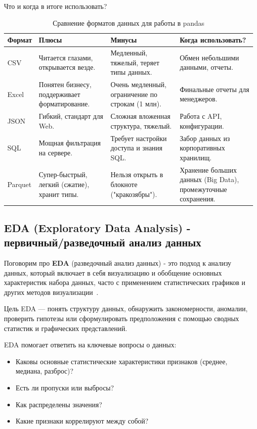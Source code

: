 \documentclass[pract]{SCWorks}
\begin{document}
Что и когда в итоге использовать?

\begin{table}[H]
\centering
\caption{Сравнение форматов данных для работы в pandas}
\begin{tabular}{|p{2cm}|p{4.2cm}|p{4.2cm}|p{4.8cm}|}
\hline
\textbf{Формат} & \textbf{Плюсы} & \textbf{Минусы} & \textbf{Когда использовать?} \\ \hline
CSV & Читается глазами, открывается везде. & Медленный, тяжелый, теряет типы данных. & Обмен небольшими данными, отчеты. \\ \hline
Excel & Понятен бизнесу, поддерживает форматирование. & Очень медленный, ограничение по строкам (1 млн). & Финальные отчеты для менеджеров. \\ \hline
JSON & Гибкий, стандарт для Web. & Сложная вложенная структура, тяжелый. & Работа с API, конфигурации. \\ \hline
SQL & Мощная фильтрация на сервере. & Требует настройки доступа и знания SQL. & Забор данных из корпоративных хранилищ. \\ \hline
Parquet & Супер-быстрый, легкий (сжатие), хранит типы. & Нельзя открыть в блокноте ("кракозябры"). & Хранение больших данных (Big Data), промежуточные сохранения. \\ \hline
\end{tabular}
\label{tab:data_formats}
\end{table}

\subsection{\textbf{EDA (Exploratory Data Analysis)} - первичный/разведочный анализ данных}

Поговорим про \textbf{EDA} (разведочный анализ данных) - это подход к анализу данных, который включает 
в себя визуализацию и обобщение основных характеристик набора данных, часто с применением статистических 
графиков и других методов визуализации~\cite{stepik}. 

Цель EDA — понять структуру данных, обнаружить закономерности, аномалии, проверить гипотезы или 
сформулировать предположения с помощью сводных статистик и графических представлений.

EDA помогает ответить на ключевые вопросы о данных:

\begin{itemize}
    \item Каковы основные статистические характеристики признаков (среднее, медиана, разброс)?
    \item Есть ли пропуски или выбросы?
    \item Как распределены значения?
    \item Какие признаки коррелируют между собой?
\end{itemize}
\end{document}
